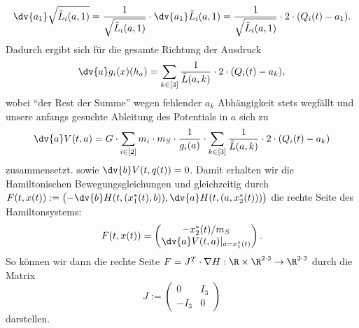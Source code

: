 \documentclass{subfiles}
\begin{document}
        \[
            \dv{a_1}\sqrt{\tilde L_i(a,1)} = \frac{1}{\sqrt{\tilde L_i(a,1)}}\cdot\dv{a_1}\tilde L_i(a,1) = \frac{1}{\sqrt{\tilde L_i(a,1)}}\cdot 2\cdot (Q_i(t) - a_1). 
        \]
        Dadurch ergibt sich für die gesamte Richtung der Ausdruck 
        \[
            \dv{a}g_i(x)(h_a) = \sum_{k\in[3]}\frac{1}{\tilde L(a,k)}\cdot 2\cdot (Q_i(t) - a_k),
        \]
        wobei \enquote{der Rest der Summe} wegen fehlender $a_k$ Abhängigkeit stets wegfällt und unsere anfangs gesuchte Ableitung des Potentials in $a$ sich zu 
        \[
            \dv{a}V(t,a) = G\cdot\sum_{i\in[2]}m_i\cdot m_S\cdot\frac{1}{g_i(a)}\cdot\sum_{k\in[3]}\frac{1}{\tilde L(a,k)}\cdot 2\cdot (Q_i(t) - a_k)
        \]
        zusammensetzt.
        sowie $\dv{b}V(t,q(t)) = 0$. Damit erhalten wir die Hamiltonischen Bewegungsgleichungen und gleichzeitig durch $F(t,x(t)):=\bigl(-\dv{b}H(t,(x_1^*(t),b)),\dv{a}H(t,(a,x_2^*(t)))\bigr)$ die rechte Seite des Hamiltonsystems:
        \begin{align*}
            F(t,x(t)) = \begin{pmatrix}
                -x_2^*(t)/m_S\\
                \dv{a}V(t,a)|_{a=x_1^* (t)}
            \end{pmatrix}.
        \end{align*}
        So können wir dann die rechte Seite $F=J^T\cdot\nabla H:\R\times\R^{2\cdot 3}\to\R^{2\cdot 3}$ durch die Matrix
        \[
            J:=\begin{pmatrix}
                0 & I_{3} \\
                -I_{3} & 0
            \end{pmatrix}
        \]
        darstellen.
\end{document}
